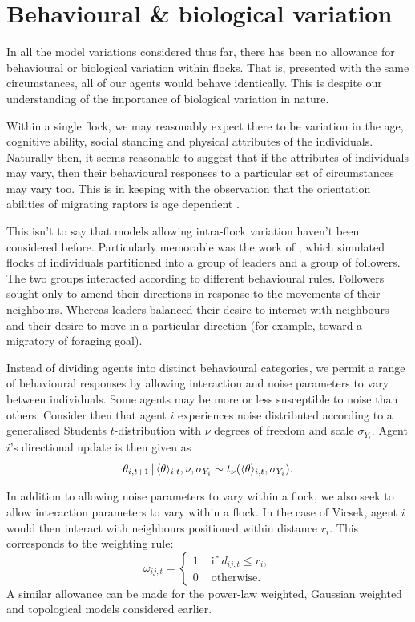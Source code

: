 \section{Behavioural \& biological variation}

In all the model variations considered thus far, there has been no allowance for
behavioural or biological variation within flocks. That is, presented with the same
circumstances, all of our agents would behave identically. This is despite our
understanding of the importance of biological variation in nature.

Within a single flock, we may reasonably expect there to be variation in the age,
cognitive ability, social standing and physical attributes of the individuals. Naturally
then, it seems reasonable to suggest that if the attributes of individuals may vary, then
their behavioural responses to a particular set of circumstances may vary too.
This is in keeping with the observation that the orientation abilities of migrating
raptors is age dependent \parencite{thorup03}.

This isn't to say that models allowing intra-flock variation haven't been considered
before. Particularly memorable was the work of \textcite{couzin05}, which simulated flocks
of individuals partitioned into a group of leaders and a group of followers. The two groups
interacted according to different behavioural rules. Followers sought only to amend their
directions in response to the movements of their neighbours. Whereas leaders balanced
their desire to interact with neighbours and their desire to move in a particular
direction (for example, toward a migratory of foraging goal).

Instead of dividing agents into distinct behavioural categories, we permit a range of
behavioural responses by allowing interaction and noise parameters to vary between
individuals. Some agents may be more or less susceptible to noise than others. Consider
then that agent $i$ experiences noise distributed according to a generalised Students
$t$-distribution with $\nu$ degrees of freedom and scale $\sigma_{Y_i}$. Agent $i$'s
directional update is then given as
\begin{equation*}
    \theta_{i,t+1} \,|\, \langle\theta\rangle_{i,t}, \nu, \sigma_{Y_i} \sim
    t_{\nu}(\langle\theta\rangle_{i,t}, \sigma_{Y_i}).
\end{equation*}

In addition to allowing noise parameters to vary within a flock, we also seek to allow
interaction parameters to vary within a flock. In the case of Vicsek, agent $i$ would then
interact with neighbours positioned within distance $r_i$. This corresponds to the
weighting rule:
\begin{equation}
    \label{eq:vicsek_interaction}
    \omega_{ij,t} =
    \begin{cases}
        1 & \text{ if } d_{ij, t} \leq r_i,\\
        0 & \text{ otherwise.}
    \end{cases}
\end{equation}
A similar allowance can be made for the power-law weighted, Gaussian weighted and
topological models considered earlier.

